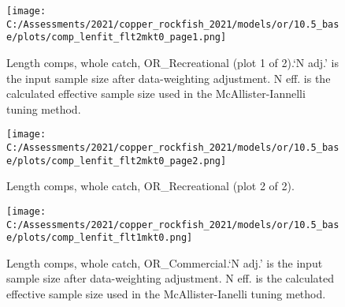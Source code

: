 \documentclass[11pt,
  english,
  a4paper,
]{article}
\begin{document}
\tagmcend\tagstructend


\begin{figure}
\centering
\texttt{[image: C:/Assessments/2021/copper\_rockfish\_2021/models/or/10.5\_base/plots/comp\_lenfit\_flt2mkt0\_page1.png]}
\caption{Length comps, whole catch, OR\_Recreational (plot 1 of 2).`N adj.' is the input sample size after data-weighting adjustment. N eff. is the calculated effective sample size used in the McAllister-Iannelli tuning method.\label{fig:comp_lenfit_flt2mkt0_page1}}
\end{figure}

\tagmcend\tagstructend


\begin{figure}
\centering
\texttt{[image: C:/Assessments/2021/copper\_rockfish\_2021/models/or/10.5\_base/plots/comp\_lenfit\_flt2mkt0\_page2.png]}
\caption{Length comps, whole catch, OR\_Recreational (plot 2 of 2).\label{fig:comp_lenfit_flt2mkt0_page2}}
\end{figure}

\tagmcend\tagstructend


\begin{figure}
\centering
\texttt{[image: C:/Assessments/2021/copper\_rockfish\_2021/models/or/10.5\_base/plots/comp\_lenfit\_flt1mkt0.png]}
\caption{Length comps, whole catch, OR\_Commercial.`N adj.' is the input sample size after data-weighting adjustment. N eff. is the calculated effective sample size used in the McAllister-Ianelli tuning method.\label{fig:comp_lenfit_flt1mkt0}}
\end{figure}

\tagmcend\tagstructend
\end{document}
